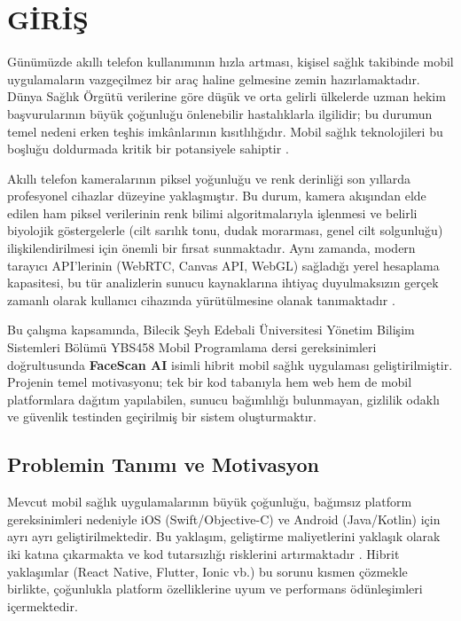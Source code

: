 \section{GİRİŞ}

Günümüzde akıllı telefon kullanımının hızla artması, kişisel sağlık takibinde mobil uygulamaların vazgeçilmez bir araç haline gelmesine zemin hazırlamaktadır. Dünya Sağlık Örgütü verilerine göre düşük ve orta gelirli ülkelerde uzman hekim başvurularının büyük çoğunluğu önlenebilir hastalıklarla ilgilidir; bu durumun temel nedeni erken teşhis imkânlarının kısıtlılığıdır. Mobil sağlık teknolojileri bu boşluğu doldurmada kritik bir potansiyele sahiptir \cite{biorn2017progressive}.

Akıllı telefon kameralarının piksel yoğunluğu ve renk derinliği son yıllarda profesyonel cihazlar düzeyine yaklaşmıştır. Bu durum, kamera akışından elde edilen ham piksel verilerinin renk bilimi algoritmalarıyla işlenmesi ve belirli biyolojik göstergelerle (cilt sarılık tonu, dudak morarması, genel cilt solgunluğu) ilişkilendirilmesi için önemli bir fırsat sunmaktadır. Aynı zamanda, modern tarayıcı API'lerinin (WebRTC, Canvas API, WebGL) sağladığı yerel hesaplama kapasitesi, bu tür analizlerin sunucu kaynaklarına ihtiyaç duyulmaksızın gerçek zamanlı olarak kullanıcı cihazında yürütülmesine olanak tanımaktadır \cite{webrtc2023spec}.

Bu çalışma kapsamında, Bilecik Şeyh Edebali Üniversitesi Yönetim Bilişim Sistemleri Bölümü YBS458 Mobil Programlama dersi gereksinimleri doğrultusunda \textbf{FaceScan AI} isimli hibrit mobil sağlık uygulaması geliştirilmiştir. Projenin temel motivasyonu; tek bir kod tabanıyla hem web hem de mobil platformlara dağıtım yapılabilen, sunucu bağımlılığı bulunmayan, gizlilik odaklı ve güvenlik testinden geçirilmiş bir sistem oluşturmaktır.

\subsection{Problemin Tanımı ve Motivasyon}

Mevcut mobil sağlık uygulamalarının büyük çoğunluğu, bağımsız platform gereksinimleri nedeniyle iOS (Swift/Objective-C) ve Android (Java/Kotlin) için ayrı ayrı geliştirilmektedir. Bu yaklaşım, geliştirme maliyetlerini yaklaşık olarak iki katına çıkarmakta ve kod tutarsızlığı risklerini artırmaktadır \cite{malavolta2015hybrid}. Hibrit yaklaşımlar (React Native, Flutter, Ionic vb.) bu sorunu kısmen çözmekle birlikte, çoğunlukla platform özelliklerine uyum ve performans ödünleşimleri içermektedir.

